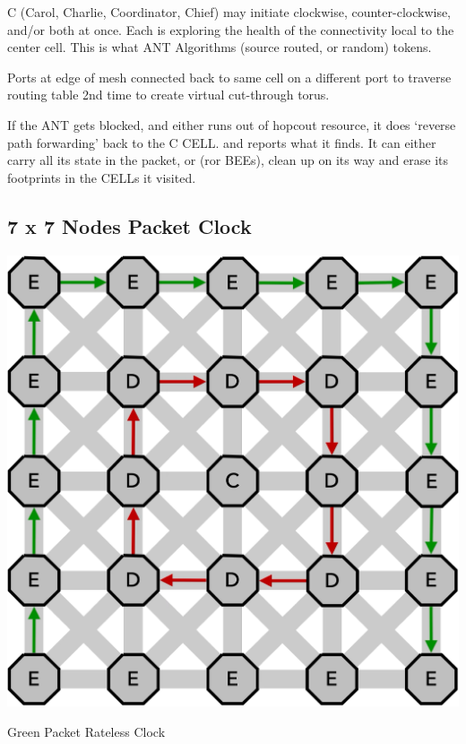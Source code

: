 C (Carol, Charlie, Coordinator, Chief) may initiate clockwise, counter-clockwise, and/or both at once. Each is exploring the health of the connectivity local to the center cell. This is what ANT Algorithms (source routed, or random) tokens. 



Ports at edge of mesh connected back to same cell on a different port to traverse routing table 2nd time to create  virtual cut-through torus.

If the ANT gets blocked, and either runs out of hopcout resource, it does `reverse path forwarding' back to the C CELL. and reports what it finds. It can either carry all its state in the packet, or (ror BEEs), clean up on its way and erase its footprints in the CELLs it visited.


\subsection{7 x 7 Nodes Packet Clock}
\marginnote{}

 \begin{marginfigure}
        \includegraphics[width=\linewidth,trim=0mm 0mm 0mm 0mm, clip]{../../FIGURES/5x5-clock.pdf} %
  \caption{Green Packet Rateless Clock}
    \vspace{20pt}
\end{marginfigure}

